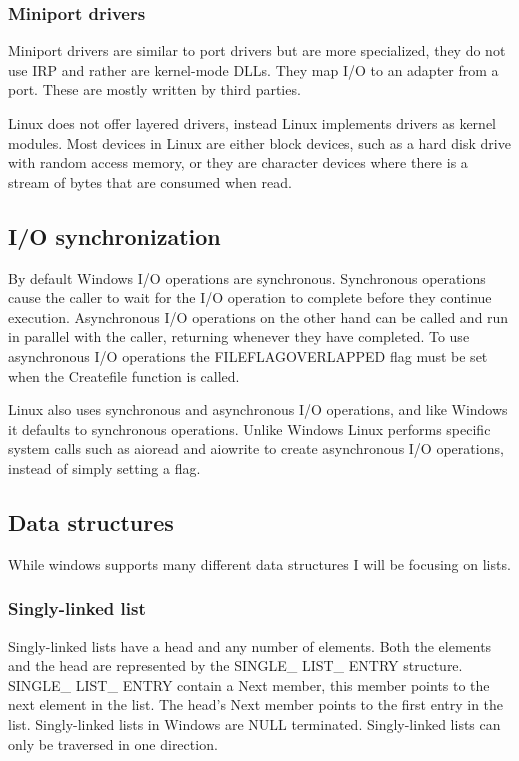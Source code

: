 \documentclass[letterpaper, 10pt, onecolumn, draftclsnofoot]{IEEEtran}
\begin{document}
\subsubsection{Miniport drivers}
Miniport drivers are similar to port drivers but are more specialized, they do not use IRP and rather are kernel-mode DLLs. They map I/O to an adapter from a port. These are mostly written by third parties.\cite{wi_p2}

Linux does not offer layered drivers, instead Linux implements drivers as kernel modules. Most devices in Linux are either block devices, such as a hard disk drive with random access memory, or they are character devices where there is a stream of bytes that are consumed when read.\cite{Linux_driver,wi_p2}

\subsection{I/O synchronization}
By default Windows I/O operations are synchronous. Synchronous operations cause the caller to wait for the I/O operation to complete before they continue execution. Asynchronous I/O operations on the other hand can be called and run in parallel with the caller, returning whenever they have completed. To use asynchronous I/O operations the FILE\textunderscore FLAG\textunderscore OVERLAPPED flag must be set when the Createfile function is called.\cite{wi_p2}

Linux also uses synchronous and asynchronous I/O operations, and like Windows it defaults to synchronous operations. Unlike Windows Linux performs specific system calls such as aio\textunderscore read and aio\textunderscore write to create asynchronous I/O operations, instead of simply setting a flag.\cite{linux} 

\subsection{Data structures}
While windows supports many different data structures I will be focusing on lists.

\subsubsection{Singly-linked list}
Singly-linked lists have a head and any number of elements.
Both the elements and the head are represented by the SINGLE\_ LIST\_ ENTRY structure. SINGLE\_ LIST\_ ENTRY contain a Next member, this member points to the next element in the list. The head's Next member points to the first entry in the list. Singly-linked lists in Windows are NULL terminated. Singly-linked lists can only be traversed in one direction.\cite{windows-driver-content}
\end{document}
